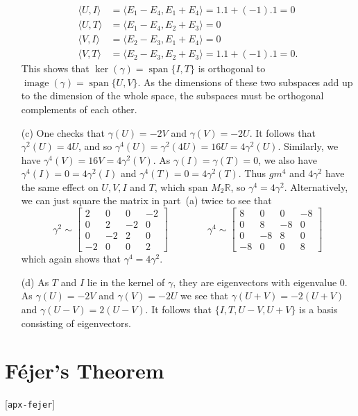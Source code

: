 \documentclass{amsart}
\newcommand{\lbl}[1]{\label{#1}\textup{[\texttt{#1}]}\ \\}
\newcommand{\lbl}{\label}
\newcommand{\R}         {{\mathbb{R}}}
\newcommand{\img}       {\operatorname{image}}
\newcommand{\spn}       {\operatorname{span}}
\newcommand{\bbm}       {\left[\begin{matrix}}
\newcommand{\ebm}       {\end{matrix}\right]}
\newcommand{\gm}        {\gamma}
\newcommand{\ip}[1]     {\langle #1\rangle}
\renewcommand{\:}       {\colon}
\theoremstyle{definition}
\renewenvironment{solution}{\SolutionAtEnd}{\endSolutionAtEnd}
\begin{document}
\begin{solution}
\begin{itemize}
   \begin{align*}
    \ip{U,I} &= \ip{E_1-E_4,E_1+E_4} = 1.1 + (-1).1 = 0 \\
    \ip{U,T} &= \ip{E_1-E_4,E_2+E_3} = 0 \\
    \ip{V,I} &= \ip{E_2-E_3,E_1+E_4} = 0 \\
    \ip{V,T} &= \ip{E_2-E_3,E_2+E_3} = 1.1 + (-1).1 = 0.
   \end{align*}
   This shows that $\ker(\gm)=\spn\{I,T\}$ is orthogonal to
   $\img(\gm)=\spn\{U,V\}$.  As the dimensions of these two
   subspaces add up to the dimension of the whole space, the
   subspaces must be orthogonal complements of each other.
  \item[(c)] One checks that $\gm(U)=-2V$ and $\gm(V)=-2U$.  It
   follows that $\gm^2(U)=4U$, and so
   $\gm^4(U)=\gm^2(4U)=16U=4\gm^2(U)$.  Similarly, we have
   $\gm^4(V)=16V=4\gm^2(V)$.  As $\gm(I)=\gm(T)=0$, we also have
   $\gm^4(I)=0=4\gm^2(I)$ and $\gm^4(T)=0=4\gm^2(T)$.  Thus $gm^4$
   and $4\gm^2$ have the same effect on $U,V,I$ and $T$, which span
   $M_2\R$, so $\gm^4=4\gm^2$.  Alternatively, we can just square
   the matrix in part~(a) twice to see that
   \[
    \gm^2\sim
     \bbm 2 &  0 &  0 & -2 \\
          0 &  2 & -2 &  0 \\
          0 & -2 &  2 &  0 \\
         -2 &  0 &  0 &  2 \ebm
    \hspace{4em}
    \gm^4\sim
     \bbm 8 &  0 &  0 & -8 \\
          0 &  8 & -8 &  0 \\
          0 & -8 &  8 &  0 \\
         -8 &  0 &  0 &  8 \ebm
   \]
   which again shows that $\gm^4=4\gm^2$.
  \item[(d)] As $T$ and $I$ lie in the kernel of $\gm$, they are
  eigenvectors with eigenvalue $0$.  As $\gm(U)=-2V$ and
  $\gm(V)=-2U$ we see that $\gm(U+V)=-2(U+V)$ and
  $\gm(U-V)=2(U-V)$.  It follows that $\{I,T,U-V,U+V\}$ is a basis
  consisting of eigenvectors.
 \end{itemize}
\end{solution}


\appendix

\section{F\'ejer's Theorem}
\lbl{apx-fejer}
\end{document}
